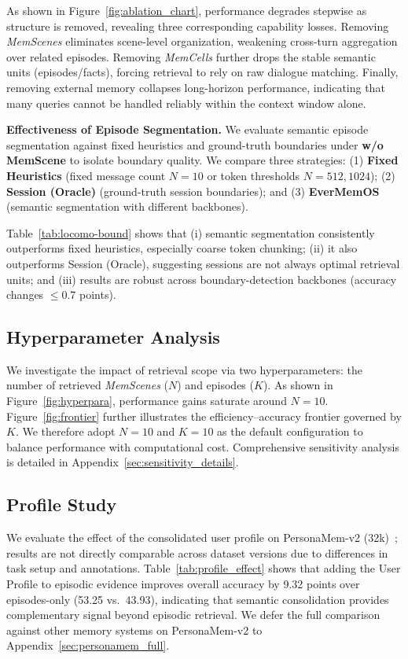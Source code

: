 As shown in Figure~\ref{fig:ablation_chart}, performance degrades stepwise as structure is removed, revealing three corresponding capability losses. Removing \textit{MemScenes} eliminates scene-level organization, weakening cross-turn aggregation over related episodes. Removing \textit{MemCells} further drops the stable semantic units (episodes/facts), forcing retrieval to rely on raw dialogue matching. Finally, removing external memory collapses long-horizon performance, indicating that many queries cannot be handled reliably within the context window alone.

\textbf{Effectiveness of Episode Segmentation.} 
We evaluate semantic episode segmentation against fixed heuristics and ground-truth boundaries under \textbf{w/o MemScene} to isolate boundary quality.
%
We compare three strategies: (1) \textbf{Fixed Heuristics} (fixed message count $N=10$ or token thresholds $N=512,1024$); (2) \textbf{Session (Oracle)} (ground-truth session boundaries); and (3) \textbf{EverMemOS} (semantic segmentation with different backbones).



Table~\ref{tab:locomo-bound} shows that (i) semantic segmentation consistently outperforms fixed heuristics, especially coarse token chunking; (ii) it also outperforms Session (Oracle), suggesting sessions are not always optimal retrieval units; and (iii) results are robust across boundary-detection backbones (accuracy changes $\leq$0.7 points).

\subsection{Hyperparameter Analysis}
\label{sec:sensitivity}
We investigate the impact of retrieval scope via two hyperparameters: the number of retrieved \textit{MemScenes} ($N$) and episodes ($K$). As shown in Figure~\ref{fig:hyperpara}, performance gains saturate around $N=10$. Figure~\ref{fig:frontier} further illustrates the efficiency--accuracy frontier governed by $K$. We therefore adopt $N=10$ and $K=10$ as the default configuration to balance performance with computational cost. Comprehensive sensitivity analysis is detailed in Appendix~\ref{sec:sensitivity_details}.


\subsection{Profile Study}
\label{sec:profile_study}

We evaluate the effect of the consolidated user profile on PersonaMem-v2 (32k)~\cite{jiang2025personamem}; results are not directly comparable across dataset versions due to differences in task setup and annotations. Table~\ref{tab:profile_effect} shows that adding the User Profile to episodic evidence improves overall accuracy by 9.32 points over episodes-only (53.25 vs.\ 43.93), indicating that semantic consolidation provides complementary signal beyond episodic retrieval. We defer the full comparison against other memory systems on PersonaMem-v2 to Appendix~\ref{sec:personamem_full}.

